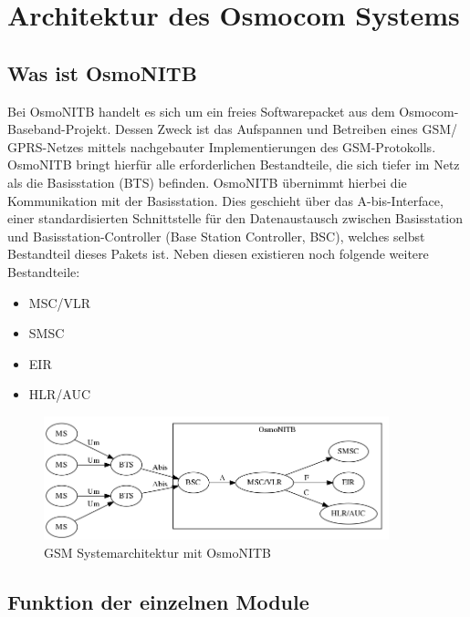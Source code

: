 \section{Architektur des Osmocom Systems}


\subsection{Was ist OsmoNITB}
Bei OsmoNITB handelt es sich um ein freies Softwarepacket aus dem Osmocom-Baseband-Projekt. Dessen Zweck ist das Aufspannen und Betreiben eines GSM/ GPRS-Netzes mittels nachgebauter Implementierungen des GSM-Protokolls. OsmoNITB bringt hierfür alle erforderlichen Bestandteile, die sich tiefer im Netz als die Basisstation (BTS) befinden. OsmoNITB übernimmt hierbei die Kommunikation mit der Basisstation. Dies geschieht über das A-bis-Interface, einer standardisierten Schnittstelle für den Datenaustausch zwischen Basisstation und Basisstation-Controller (Base Station Controller, BSC), welches selbst Bestandteil dieses Pakets ist. Neben diesen existieren noch folgende weitere Bestandteile:




\begin{itemize}
\item MSC/VLR\\
\item SMSC\\
\item EIR\\
\item HLR/AUC\\
\end{itemize}



\begin{figure}[h]
    \centering
    \includegraphics[width=10cm]{includes/osmonitb}
    \caption{GSM Systemarchitektur mit OsmoNITB}
	\label{fig:osmonitb}
\end{figure}






\subsection{Funktion der einzelnen Module}




